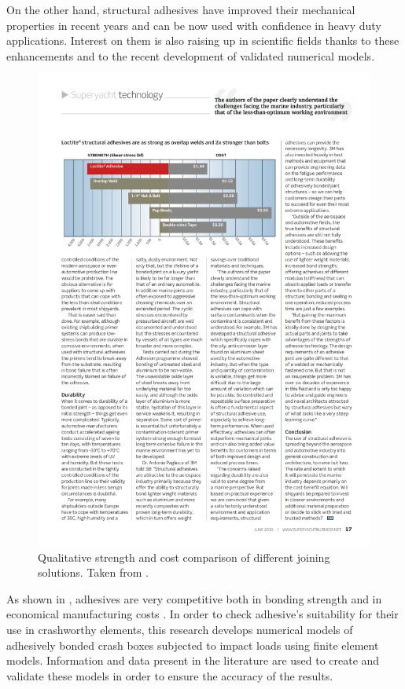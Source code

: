 \documentclass[cmfonts]{witpress}
\begin{document}
On the other hand, structural adhesives have improved their mechanical properties in recent years and can be now used with confidence in heavy duty applications. Interest on them is also raising up in scientific fields thanks to these enhancements and to the recent development of validated numerical models.
\begin{figure}
	\centering
	\includegraphics[width=\linewidth]{./figures/IMG_CUTRES/comparison}
	\caption[Qualitative strength and cost comparison of different joining solutions.]{Qualitative strength and cost comparison of different joining solutions. Taken from \cite{superyacht}.}
	\label{fig:comparison}
\end{figure}

As shown in , adhesives are very competitive both in bonding strength and in economical manufacturing costs \cite{superyacht}. In order to check adhesive's suitability for their use in crashworthy elements, this research develops numerical models of adhesively bonded crash boxes subjected to impact loads using finite element models. Information and data present in the literature are used to create and validate these models in order to ensure the accuracy of the results.
\end{document}
